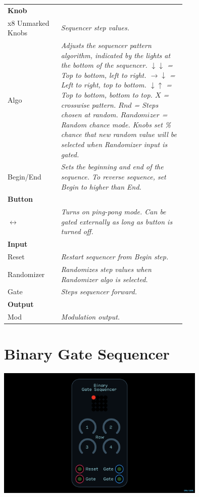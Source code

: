 \documentclass[11pt]{book}
\begin{document}
\begin{table}[ht]
\small
\sffamily
\renewcommand\arraystretch{1.5}
\centering
\begin{tabular}{l*{1}{>{\raggedright\arraybackslash}p{0.7\linewidth}}}

\toprule
\textbf{Knob} \\
x8 Unmarked Knobs & \textit{Sequencer step values.} \\
Algo & \textit{Adjusts the sequencer pattern algorithm, indicated by the lights at the bottom of the sequencer. $\downarrow \downarrow$ = Top to bottom, left to right. $\rightarrow \downarrow$ = Left to right, top to bottom. $\downarrow \uparrow$ = Top to bottom, bottom to top. $X$ = crosswise pattern. $Rnd$ = Steps chosen at random. $Randomizer$ = Random chance mode. Knobs set \% chance that new random value will be selected when Randomizer input is gated.} \\
Begin/End & \textit{Sets the beginning and end of the sequence. To reverse sequence, set Begin to higher than End.} \\

\midrule
\textbf{Button} \\
$\leftrightarrow$ & \textit{Turns on ping-pong mode. Can be gated externally as long as button is turned off.} \\

\midrule
\textbf{Input} \\
Reset & \textit{Restart sequencer from Begin step.} \\
Randomizer & \textit{Randomizes step values when Randomizer algo is selected.} \\
Gate & \textit{Steps sequencer forward.} \\

\midrule
\textbf{Output} \\
Mod & \textit{Modulation output.} \\

\bottomrule
\end{tabular}
\end{table}

\pagebreak


\section{Binary Gate Sequencer}

\begin{center}
\includegraphics[width=0.75\textwidth]{binary-gate-sequencer.png}
\end{center}
\end{document}
